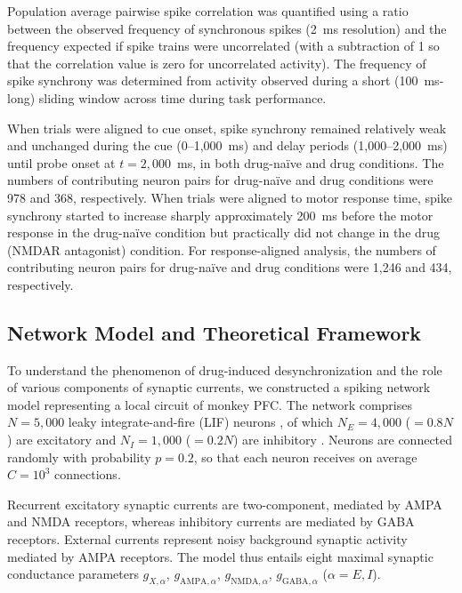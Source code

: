 \documentclass[12pt]{article}
\begin{document}
Population average pairwise spike correlation was quantified using a ratio between the observed frequency of synchronous spikes (2~ms resolution) and the frequency expected if spike trains were uncorrelated (with a subtraction of 1 so that the correlation value is zero for uncorrelated activity). The frequency of spike synchrony was determined from activity observed during a short (100~ms-long) sliding window across time during task performance.

When trials were aligned to cue onset, spike synchrony remained relatively weak and unchanged during the cue (0--1{,}000~ms) and delay periods (1{,}000--2{,}000~ms) until probe onset at $t = 2{,}000$~ms, in both drug-na\"ive and drug conditions. The numbers of contributing neuron pairs for drug-na\"ive and drug conditions were 978 and 368, respectively. When trials were aligned to motor response time, spike synchrony started to increase sharply approximately 200~ms before the motor response in the drug-na\"ive condition but practically did not change in the drug (NMDAR antagonist) condition. For response-aligned analysis, the numbers of contributing neuron pairs for drug-na\"ive and drug conditions were 1{,}246 and 434, respectively.

\subsection{Network Model and Theoretical Framework}

To understand the phenomenon of drug-induced desynchronization and the role of various components of synaptic currents, we constructed a spiking network model representing a local circuit of monkey PFC. The network comprises $N = 5{,}000$ leaky integrate-and-fire (LIF) neurons \citep{DayanAbbott2001}, of which $N_E = 4{,}000$ ($= 0.8N$) are excitatory and $N_I = 1{,}000$ ($= 0.2N$) are inhibitory \citep{Abeles1991, BraitenbergSchuz1998}. Neurons are connected randomly with probability $p = 0.2$, so that each neuron receives on average $C = 10^3$ connections.

Recurrent excitatory synaptic currents are two-component, mediated by AMPA and NMDA receptors, whereas inhibitory currents are mediated by GABA receptors. External currents represent noisy background synaptic activity mediated by AMPA receptors. The model thus entails eight maximal synaptic conductance parameters $g_{X,\alpha}$, $g_{\text{AMPA},\alpha}$, $g_{\text{NMDA},\alpha}$, $g_{\text{GABA},\alpha}$ ($\alpha = E, I$).
\end{document}
